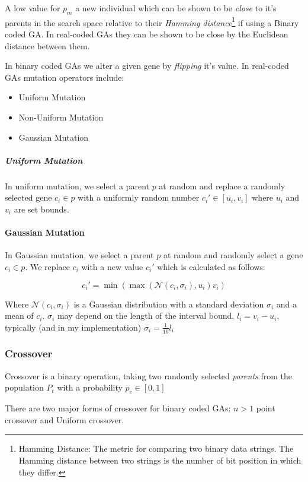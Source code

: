 A low value for $p_m$ a new individual which can be shown to be \textit{close} to it's parents in the search space relative to their \textit{Hamming distance}\footnote{Hamming Distance: The metric for comparing two binary data strings. The Hamming distance between two strings is the number of bit position in which they differ.} if using a Binary coded GA. In real-coded GAs they can be shown to be close by the Euclidean distance between them.

In binary coded GAs we alter a given gene by \textit{flipping} it's value.
In real-coded GAs mutation operators include: 
\begin{itemize}
    \item Uniform Mutation
    \item Non-Uniform Mutation
    \item Gaussian Mutation 
\end{itemize}
\subparagraph{Uniform Mutation}
In uniform mutation, we select a parent $p$ at random and replace a randomly selected gene $c_i \in p$ with a uniformly random number $c_i' \in [u_i,v_i]$  where $u_i$ and $v_i$ are set bounds.

\paragraph{Gaussian Mutation}

In Gaussian mutation, we select a parent $p$ at random and randomly select a gene $c_{i} \in p$. We replace $c_{i}$ with a new value $c_{i}'$ which is calculated as follows:

\begin{equation}
  c_{i}' = \min(\max(\mathcal{N}(c_{i},\sigma_{i}), u_{i}) v_{i})
\end{equation}

Where $\mathcal{N}(c_{i},\sigma_{i})$ is a Gaussian distribution with a standard deviation \(\sigma_{i}\) and a mean of $c_{i}$. \(\sigma_{i}\) may depend on the length of the interval bound, $l_{i} = v_{i} - u_{i}$, typically (and in my implementation) $\sigma_{i} = \frac{1}{10}l_{i}$


\subsubsection{Crossover}

Crossover is a binary operation, taking two randomly selected \textit{parents} from the population $P_t$ with a probability $p_c \in [0,1]$ 

There are two major forms of crossover for binary coded GAs: $n>1$ point crossover and Uniform crossover. 

